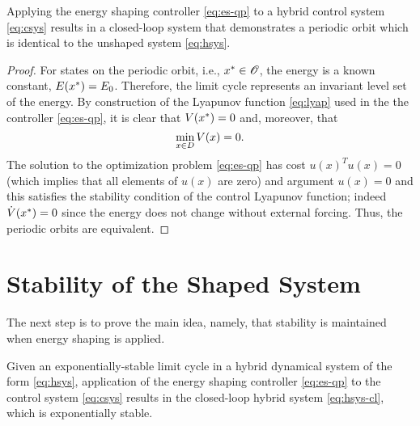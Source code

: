 \begin{lemma}
  Applying the energy shaping controller \eqref{eq:es-qp} to a hybrid control system \eqref{eq:csys} results in a closed-loop system that demonstrates a periodic orbit which is identical to the unshaped system \eqref{eq:hsys}.
\end{lemma}

\begin{proof}
  For states on the periodic orbit, i.e., $x^{*} \in \mathscr{O}$, the energy is a known constant, $E(x^{*}) = E_{0}$.
  Therefore, the limit cycle represents an invariant level set of the energy.
  By construction of the Lyapunov function \eqref{eq:lyap} used in the the controller \eqref{eq:es-qp}, it is clear that $V(x^{*}) = 0$ and, moreover, that $$\min_{x \in D} V(x) = 0.$$
  The solution to the optimization problem \eqref{eq:es-qp} has cost $u(x)^T u(x) = 0$ (which implies that all elements of $u(x)$ are zero) and argument $u(x) = 0$ and this satisfies the stability condition of the control Lyapunov function; indeed ${\dot V}(x^{*}) = 0$ since the energy does not change without external forcing.
  Thus, the periodic orbits are equivalent.
\end{proof}

\section*{Stability of the Shaped System}

The next step is to prove the main idea, namely, that stability is maintained when energy shaping is applied.

\begin{theorem}
  Given an exponentially-stable limit cycle in a hybrid dynamical system of the form \eqref{eq:hsys}, application of the energy shaping controller \eqref{eq:es-qp} to the control system \eqref{eq:csys} results in the closed-loop hybrid system \eqref{eq:hsys-cl}, which is exponentially stable.
\end{theorem}

